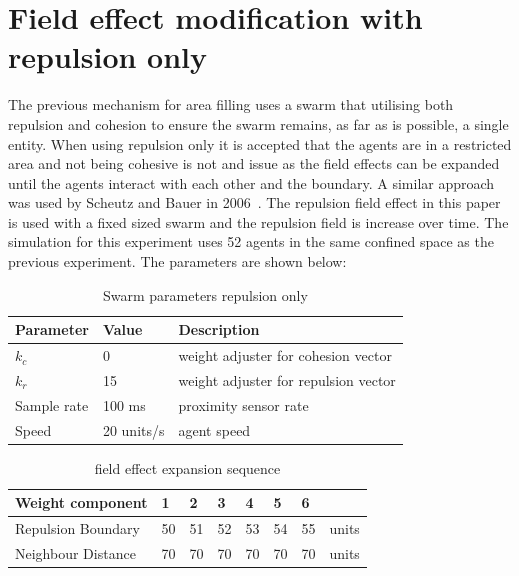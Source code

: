 \documentclass[10pt,journal,letterpaper,twoside]{IEEEtran}
\begin{document}
\section{Field effect modification with repulsion only}
The previous mechanism for area filling uses a swarm that utilising both repulsion and cohesion to ensure the swarm remains, as far as is possible, a single entity. When using repulsion only it is accepted that the agents are in a restricted area and not being cohesive is not and issue as the field effects can be expanded until the agents interact with each other and the boundary. A similar approach was used by Scheutz and Bauer in 2006~\cite{SB:06}. The repulsion field effect in this paper is used with a fixed sized swarm and the repulsion field is increase over time. The simulation for this experiment uses 52 agents in the same confined space as the previous experiment. The parameters are shown below: 

\begin{table}
\begin{center}
\begin{tabular}{| p{1.5cm} | p{1.5cm} | p{4.0cm} |}
\hline
\bf Parameter & \bf Value  & \bf Description \\ \hline
$k_c$         & 0          & weight adjuster for cohesion vector\\ \hline
$k_r$         & 15         & weight adjuster for repulsion vector\\ \hline
Sample rate   & 100 ms      & proximity sensor rate\\ \hline
Speed         & 20 units/s & agent speed\\ \hline
\end{tabular}\caption{Swarm parameters repulsion only} \label{tab:FillParameters}
\end{center}
\end{table}

\begin{table}
\begin{center}
\begin{tabular}{| p{1.5cm} | p{0.3cm} | p{0.3cm} | p{0.3cm} | p{0.3cm} | p{0.3cm} | p{0.3cm} | p{0.5cm} |}
\hline
\bf Weight \bf component & \bf 1 & \bf 2 & \bf 3 & \bf 4 & \bf 5 & \bf 6 & \\ \hline
Repulsion Boundary & 50 & 51 & 52 & 53 & 54 & 55 & units\\  \hline
Neighbour Distance & 70 & 70 & 70 & 70 & 70 & 70 & units\\  \hline
\end{tabular}\caption{field effect expansion sequence} \label{tab:BaselineConcaveReduction}
\end{center}
\end{table}
\end{document}
